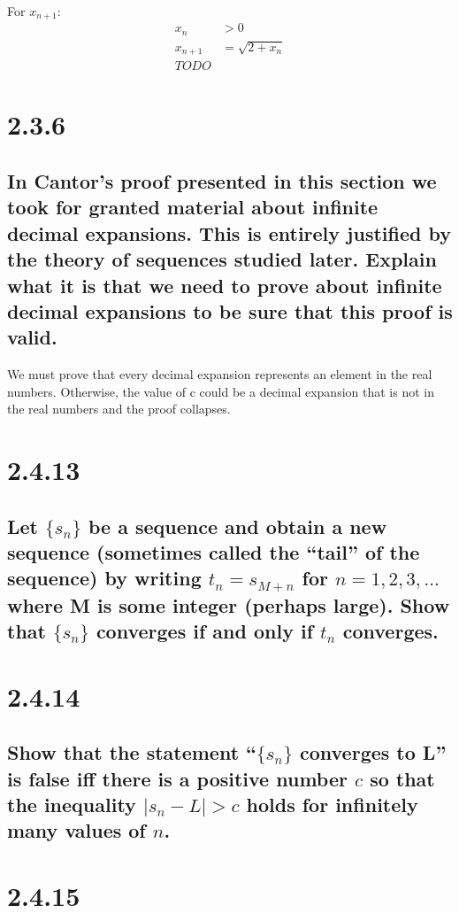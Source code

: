 \documentclass[11pt]{article}
\begin{document}
	For $x_{n+1}$:
	\begin{align*}
	x_n &> 0 \\ 
	x_{n+1} &= \sqrt{2 + x_n}
	\\TODO
	\end{align*}
	
	
	\section*{2.3.6}
	\subsection*{In Cantor’s proof presented in this section we took for granted material about infinite decimal expansions. This is entirely justified by the theory of sequences studied later. Explain what it is that we need to prove about infinite decimal expansions to be sure that this proof is valid.}
	
	We must prove that every decimal expansion represents an element in the real numbers. Otherwise, the value of c could be a decimal expansion that is not in the real numbers and the proof collapses. 
	
	
	\section*{2.4.13}
	\subsection*{Let $\{s_n\}$ be a sequence and obtain a new sequence (sometimes called the “tail” of the sequence) by writing
		$t_n = s_{M+n}$ for $n = 1, 2, 3, \ldots$ where M is some integer (perhaps large). Show that $\{s_n\}$ converges if and only if ${t_n}$ converges.}
	
	
	
	\section*{2.4.14}
	\subsection*{Show that the statement “$\{s_n\}$ converges to L” is false iff there is a positive number $c$ so that the inequality $|s_n − L| > c$ holds for infinitely many values of $n$.}
	
	
	
	\section*{2.4.15}
\end{document}
